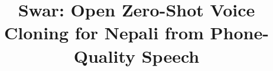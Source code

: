 \documentclass[conference]{IEEEtran}
\begin{document}
\title{Swar: Open Zero-Shot Voice Cloning for Nepali from Phone-Quality Speech}

\author{
}

\maketitle











\end{document}
